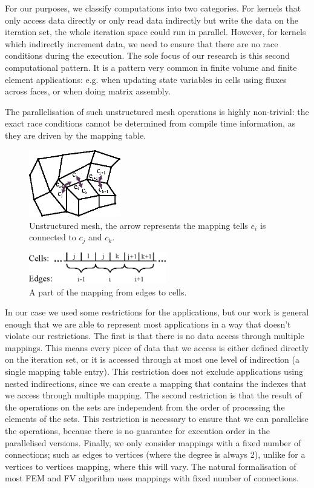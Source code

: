 For our purposes, we classify computations into two categories. For kernels that
only access data directly or only read data indirectly but write the data on
the iteration set, the whole iteration space could run in parallel. However,
for kernels which indirectly increment data, we need to ensure that there are
no race conditions during the execution. The sole focus of our research is this second computational pattern. It is a pattern very common in finite volume and finite element applications: e.g. when updating state variables in cells using fluxes across faces, or when doing matrix assembly.

The parallelisation of such unstructured mesh operations is highly non-trivial: the exact race conditions cannot be determined from compile
time information, as they are driven by the mapping table.

\begin{figure}
\centering
\includegraphics[width=4cm]{fig/svg/unstructured.eps}
\caption{Unstructured mesh, the arrow represents the mapping tells $e_i$ is
  connected to $c_j$ and $c_k$.}
\label{fig:unstructured}
\end{figure}



\begin{figure}
\centering
\includegraphics[width=6cm]{fig/svg/mapping.eps}
\caption{A part of the mapping from edges to cells.}
\label{fig:mapping}
\end{figure}

In our case we used some restrictions for the applications, but our work is
general enough that we are able to represent most applications in a way that
doesn't violate our restrictions. The first is that there is no data access
through multiple mappings. This means every piece of data that we access is either
defined directly on the iteration set, or it is accessed
through at most one level of indirection (a single mapping table entry). This restriction does not exclude applications
using nested indirections, since we can create a mapping that contains the
indexes that we access through multiple mapping. The second restriction is that
the result of the operations on the sets are independent from the order of
processing the elements of the sets. This restriction is necessary to ensure
that we can parallelise the operations, because there is no guarantee for
execution order in the parallelised versions. Finally, we only consider mappings with a fixed number of connections; such as edges to vertices (where the degree is always 2), unlike for a vertices to vertices mapping, where this will vary. The natural formalisation of most FEM and FV algorithm uses mappings with fixed number of connections.

